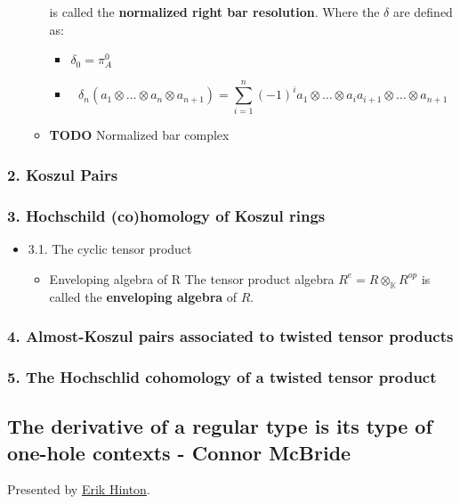 \documentclass[11pt]{article}
\begin{document}
\begin{itemize}
\begin{itemize}
is called the \textbf{normalized right bar resolution}. Where
the $\delta$ are defined as:

\begin{itemize}
\item $\delta_0 = \pi^0_A$
\item \[ \delta_n(a_1 \otimes \dots \otimes a_n \otimes a_{n+1}) 
      = \sum_{i=1}^n (-1)^i  a_1 \otimes \dots \otimes a_ia_{i+1} \otimes \dots \otimes a_{n+1}\]
\end{itemize}

\item {\bfseries\sffamily TODO} Normalized bar complex
\label{sec-1-5-2-5-2}
\end{itemize}
\end{itemize}

\subsubsection*{2. Koszul Pairs}
\label{sec-1-5-3}

\subsubsection*{3. Hochschild (co)homology of Koszul rings}
\label{sec-1-5-4}
\begin{itemize}
\item 3.1. The cyclic tensor product
\label{sec-1-5-4-1}
\begin{itemize}
\item Enveloping algebra of R
\label{sec-1-5-4-1-1}
The tensor product algebra $R^e = R \otimes_\mathbb{K} R^{op}$ is called the 
\textbf{enveloping algebra} of $R$.
\end{itemize}
\end{itemize}

\subsubsection*{4. Almost-Koszul pairs associated to twisted tensor products}
\label{sec-1-5-5}

\subsubsection*{5. The Hochschlid cohomology of a twisted tensor product}
\label{sec-1-5-6}

\subsection*{The derivative of a regular type is its type of one-hole contexts - Connor McBride}
\label{sec-1-6}
Presented by \href{https://www.youtube.com/watch?v=K7tQsKxC2I8}{Erik Hinton}.
\end{document}
